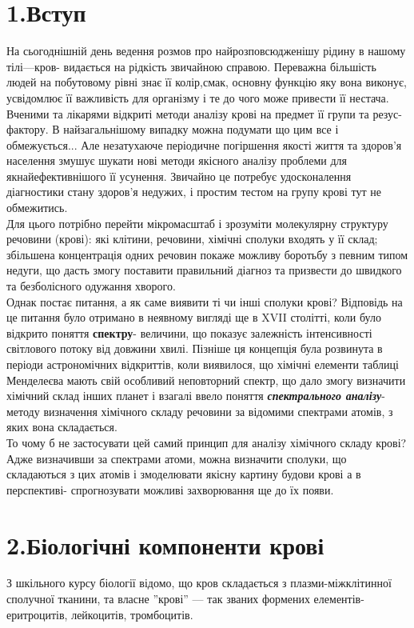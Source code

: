\documentclass[14pt,a4paper]{scrartcl}
\begin{document}
\newpage
\section*{1.Вступ}
На сьогоднішній день ведення розмов про найрозповсюдженішу рідину в нашому тілі---кров- видається на рідкість звичайною справою. Переважна більшість людей на побутовому рівні знає її колір,смак, основну функцію яку вона виконує, усвідомлює її важливість для організму і те до чого може привести її нестача. Вченими та лікарями відкриті методи аналізу крові на предмет її групи та резус-фактору. В найзагальнішому випадку можна подумати що цим все і обмежується... Але незатухаюче періодичне погіршення якості життя та здоров'я населення змушує шукати нові методи якісного аналізу проблеми для якнайефективнішого її усунення. Звичайно це потребує удосконалення діагностики стану здоров'я недужих, і простим тестом на  групу крові тут не обмежитись.\\

 Для цього потрібно перейти мікромасштаб і зрозуміти молекулярну структуру речовини (крові): які клітини, речовини, хімічні сполуки входять у її склад; збільшена концентрація одних речовин покаже можливу боротьбу з певним типом недуги, що дасть змогу поставити правильний діагноз та призвести до швидкого та безболісного одужання хворого.\\

Однак постає питання, а як саме виявити ті чи інші сполуки крові? Відповідь на це питання було отримано в неявному вигляді ще в XVII столітті, коли було відкрито поняття {\bf спектру}- величини, що показує залежність інтенсивності світлового потоку від довжини хвилі. Пізніше ця концепція була розвинута в періоди астрономічних відкриттів, коли виявилося, що хімічні елементи таблиці Менделеєва мають свій особливий неповторний спектр, що дало змогу визначити хімічний склад інших планет і взагалі ввело поняття {\bf\itshape спектрального аналізу}- методу визначення хімічного складу речовини за відомими спектрами атомів, з яких вона складається.\\

То чому б не застосувати цей самий принцип для аналізу хімічного складу крові? Адже визначивши за спектрами атоми, можна визначити сполуки, що складаються з цих атомів і змоделювати якісну картину будови крові а в перспективі- спрогнозувати можливі захворювання ще до їх появи.\\
\newpage

\section*{2.Біологічні компоненти крові}
З шкільного курсу біології відомо, що кров складається з плазми-міжклітинної сполучної тканини, та власне ''крові'' --- так званих формених елементів- еритроцитів, лейкоцитів, тромбоцитів.
\end{document}
